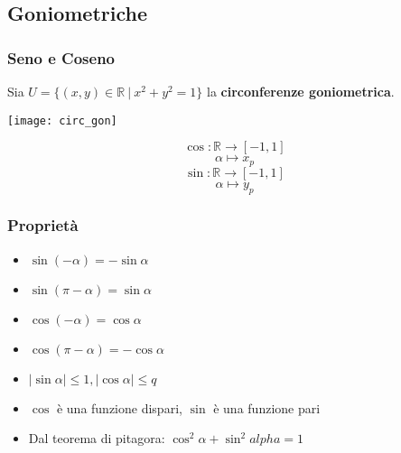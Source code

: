 \subsection{Goniometriche}
    \subsubsection{Seno e Coseno}
        Sia $U = \{(x,y) \in \mathbb{R}\ |\ x^{2} + y^{2} = 1\}$ la \textbf{circonferenze goniometrica}.\\
        \begin{center}
            \texttt{[image: circ\_gon]}
        \end{center}
        \[
            \cos:\mathbb{R} \rightarrow [-1,1]    
        \]
        \[
            \alpha \mapsto x_{p}    
        \]
        \[
            \sin:\mathbb{R} \rightarrow [-1,1]    
        \]
        \[
            \alpha \mapsto y_{p}    
        \]
        \subsubsection*{Proprietà}
            \begin{Large}
                \begin{itemize}
                    \item $\sin{(- \alpha)} = - \sin{\alpha}$
                    \item $\sin{(\pi - \alpha)} = \sin{\alpha}$
                    \item $\cos{(- \alpha)} = \cos{\alpha}$
                    \item $\cos{(\pi - \alpha)} = - \cos{\alpha}$
                    \item $|\sin{\alpha}| \leq 1, |\cos{\alpha}| \leq q$
                    \item $\cos$ è una funzione dispari, $\sin$ è una funzione pari
                    \item Dal teorema di pitagora: $\cos^{2}{\alpha} + \sin^{2}{alpha} = 1$
                \end{itemize}
            \end{Large}
